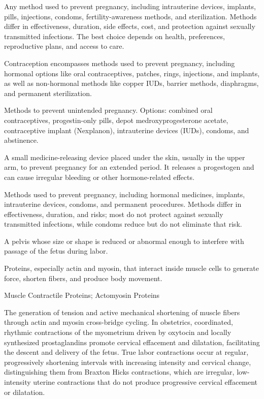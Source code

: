  Any method used to prevent pregnancy, including intrauterine devices, implants, pills, injections, condoms, fertility-awareness methods, and sterilization. Methods differ in effectiveness, duration, side effects, cost, and protection against sexually transmitted infections. The best choice depends on health, preferences, reproductive plans, and access to care.

 Contraception encompasses methods used to prevent pregnancy, including hormonal options
like oral contraceptives, patches, rings, injections, and implants, as well as
non-hormonal methods like copper IUDs, barrier methods, diaphragms, and permanent
sterilization.

 Methods to prevent unintended pregnancy. Options: combined oral contraceptives,
progestin-only pills, depot medroxyprogesterone acetate, contraceptive implant
(Nexplanon), intrauterine devices (IUDs), condoms, and abstinence.

 A small medicine-releasing device placed under the skin, usually in the upper arm, to prevent pregnancy for an extended period. It releases a progestogen and can cause irregular bleeding or other hormone-related effects.

 Methods used to prevent pregnancy, including hormonal medicines, implants, intrauterine devices, condoms, and permanent procedures. Methods differ in effectiveness, duration, and risks; most do not protect against sexually transmitted infections, while condoms reduce but do not eliminate that risk.

 A pelvis whose size or shape is reduced or abnormal enough to interfere with passage of
the fetus during labor.

 Proteins, especially actin and myosin, that interact inside muscle cells to generate force, shorten fibers, and produce body movement.

\synonyms
Muscle Contractile Proteins; Actomyosin Proteins

 The generation of tension and active mechanical shortening of muscle fibers through actin and myosin cross-bridge cycling. In obstetrics, coordinated, rhythmic contractions of the myometrium driven by oxytocin and locally synthesized prostaglandins promote cervical effacement and dilatation, facilitating the descent and delivery of the fetus. True labor contractions occur at regular, progressively shortening intervals with increasing intensity and cervical change, distinguishing them from Braxton Hicks contractions, which are irregular, low-intensity uterine contractions that do not produce progressive cervical effacement or dilatation.

